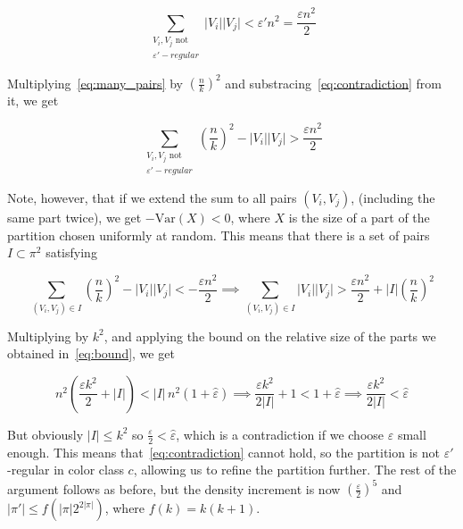 \documentclass{amsart}
\theoremstyle{plain}
\theoremstyle{definition}
\begin{document}
    \begin{equation}\label{eq:contradiction}
        \sum_{\substack{V_i, V_j \text{ not } \\ \varepsilon'-regular}} \lvert V_i \rvert \lvert V_j \rvert < \varepsilon' n^2 = \frac{\varepsilon n^2}{2}
    \end{equation}

    Multiplying~\eqref{eq:many_pairs} by $\left(\frac{n}{k}\right)^2$ and substracing~\eqref{eq:contradiction} from it, we get

    \begin{equation}\label{eq:combined}
        \sum_{\substack{V_i, V_j \text{ not } \\ \varepsilon'-regular}} \left( \frac{n}{k} \right)^2 - \lvert V_i \rvert \lvert V_j \rvert > \frac{\varepsilon n^2}{2}
    \end{equation}

    Note, however, that if we extend the sum to all pairs $(V_i, V_j)$, (including the same part twice), we get $-\text{Var}(X) < 0$,
    where $X$ is the size of a part of the partition chosen uniformly at random.
    This means that there is a set of pairs $I \subset \pi^2$ satisfying

    \begin{equation*}\label{eq:others}
        \sum_{(V_i, V_j) \in I} \left( \frac{n}{k} \right)^2 - \lvert V_i \rvert \lvert V_j \rvert <  - \frac{\varepsilon n^2}{2}
        \implies \sum_{(V_i, V_j) \in I} \lvert V_i \rvert \lvert V_j \rvert > \frac{\varepsilon n^2}{2} + \lvert I \rvert \left( \frac{n}{k} \right)^2
    \end{equation*}

    Multiplying by $k^2$, and applying the bound on the relative size of the parts we obtained in~\eqref{eq:bound}, we get

    \begin{equation*}\label{eq:equation}
        n^2 \left( \frac{\varepsilon k^2}{2} + \lvert I \rvert \right) < \lvert I \rvert \, n^2 \left( 1 + \hat{\varepsilon} \right)
        \implies \frac{\varepsilon k^2}{2 \lvert I \rvert} + 1 < 1 + \hat{\varepsilon}
        \implies \frac{\varepsilon k^2}{2 \lvert I \rvert} < \hat{\varepsilon}
    \end{equation*}

    But obviously $\lvert I \rvert \leq k^2$ so $\frac{\varepsilon}{2} < \hat{\varepsilon}$, which is a contradiction
    if we choose $\varepsilon$ small enough.
    This means that~\eqref{eq:contradiction} cannot hold,
    so the partition is not $\varepsilon'$-regular in color class $c$, allowing us to refine
    the partition further.
    The rest of the argument follows as before, but the density increment is now $(\frac{\varepsilon}{2})^5$
    and $\lvert \pi' \rvert \leq f\left( \lvert \pi \rvert 2^{2 \lvert \pi \rvert}\right)$,
    where $f(k) = k(k+1)$.
\end{document}
